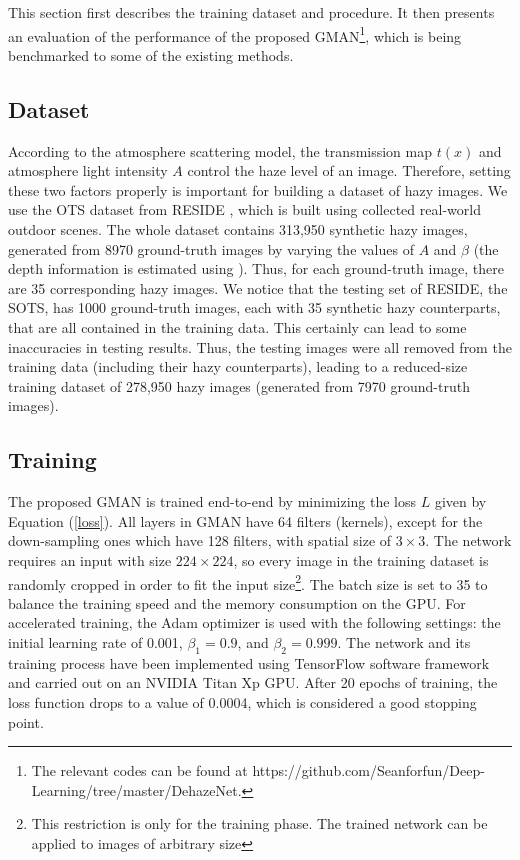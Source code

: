 \documentclass[journal]{IEEEtran}
\begin{document}
This section first describes the training dataset and procedure. It then presents an evaluation of the performance of the proposed GMAN\footnote{The relevant codes can be found at https://github.com/Seanforfun/Deep-Learning/tree/master/DehazeNet.}, which is being benchmarked to some of the existing methods.

\subsection{Dataset}

According to the atmosphere scattering model, the transmission map $t(x)$ and atmosphere light intensity $A$ control the haze level of an image. Therefore, setting these two factors properly is important for building a dataset of hazy images. We use the OTS dataset from RESIDE \cite{li2017reside}, which is built using collected real-world outdoor scenes. The whole dataset contains 313,950 synthetic hazy images, generated from 8970 ground-truth images by varying the values of $A$ and $\beta$ (the depth information is estimated using \cite{liu2016learning}).
  Thus, for each ground-truth image, there are 35 corresponding hazy images. We notice that the testing set of RESIDE, the SOTS, has 1000 ground-truth images, each with 35 synthetic hazy counterparts, that are all contained in the training data. This certainly can lead to some inaccuracies in testing results. Thus, the testing images were all removed from the training data (including their hazy counterparts), leading to a reduced-size training dataset of 278,950 hazy images (generated from 7970 ground-truth images).

\subsection{Training}

The proposed GMAN is trained end-to-end by minimizing the loss $L$ given by Equation (\ref{loss}). All layers in GMAN have 64 filters (kernels), except for the down-sampling ones which have 128 filters, with spatial size of $3\times3$. The network requires an input with size $224\times224$, so every image in the training dataset is randomly cropped in order to fit the input size\footnote{This restriction is only for the training phase. The trained network can be applied to images of arbitrary size}. The batch size is set to 35 to balance the training speed and the memory consumption on the GPU. For accelerated training, the Adam optimizer \cite{AdamOpt} is used with the following settings: the initial learning rate of 0.001, $\beta_1=0.9$, and $\beta_2=0.999$. The network and its training process have been implemented using TensorFlow software framework and carried out on an NVIDIA Titan Xp GPU. After 20 epochs of training, the loss function drops to a value of 0.0004, which is considered a good stopping point.
\end{document}
